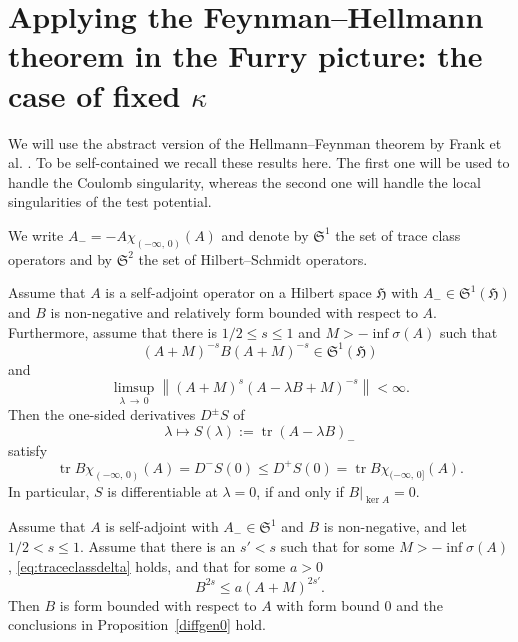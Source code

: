 \documentclass[AHL,Unicode,longabstracts,published]{cedram}
\DeclareMathOperator{\tr}{tr}
\newcommand*\gH{\mathfrak{H}}
\newcommand*\gS{\mathfrak{S}}
\begin{document}
\section{Applying the Feynman--Hellmann theorem in the Furry picture: the case of fixed \texorpdfstring{$\kappa$}{kappa}}

We will use the abstract version of the Hellmann--Feynman theorem by Frank et al. \cite[Theorem~3.2 and Proposition~3.3]{Franketal2020P}. To be self-contained we recall these results here. The first one will be used to handle the Coulomb singularity, whereas the second one will handle the local singularities of the test potential.

We write $A_-=-A\chi_{(-\infty,\,0)}(A)$ and denote by $\gS^1$ the set of trace class operators and by $\gS^2$ the set of Hilbert--Schmidt operators.

\begin{prop}\label{diffgen0}
Assume that $A$ is a self-adjoint operator on a Hilbert space $\gH$ with $A_-\in\gS^1(\gH)$ and $B$ is non-negative and relatively form bounded with respect to $A$. Furthermore, assume that there is $1/2\leq s\leq 1$ and $M>-\inf\sigma(A)$ such that
\begin{equation}\label{eq:traceclassdelta}
(A+M)^{-s} B (A+M)^{-s}\in\gS^1(\gH)
\end{equation}
and
\begin{equation}\label{eq:relbounddelta}
\limsup_{\lambda\,\to\,0} \left\| (A+M)^{s} (A-\lambda B+M)^{-s} \right\| <\infty.
\end{equation}
Then the one-sided derivatives $D^\pm S$ of
\[
\lambda\mapsto S(\lambda):=\tr(A-\lambda B)_-
\]
satisfy
\[
\tr B\chi_{(-\infty,\,0)}(A)=D^-S(0)\leq D^+S(0)=\tr B\chi_{(-\infty,\,0]}(A).
\]
In particular, $S$ is differentiable at $\lambda=0$, if and only if $B|_{\ker A}=0$.
\end{prop}

\begin{prop}\label{diffgen}
Assume that $A$ is self-adjoint with $A_{-} \in\gS^1$ and $B$ is non-negative, and let $1/2<s\leq1$. Assume that there is an $s'<s$ such that for some $M>-\inf\sigma(A)$, \eqref{eq:traceclassdelta} holds, and that for some $a>0$
\begin{equation}\label{eq:increasedrelbdd}
B^{2s} \leq a(A+M)^{2s'}.
\end{equation}
Then $B$ is form bounded with respect to $A$ with form bound $0$ and the conclusions in Proposition~\ref{diffgen0} hold.
\end{prop}
\end{document}
